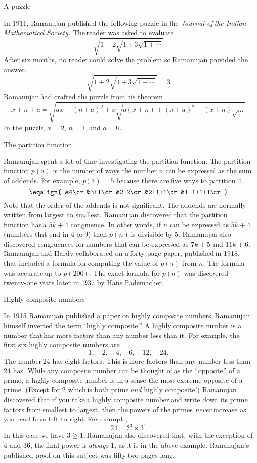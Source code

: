  A puzzle

In 1911, Ramanujan published the following puzzle in
the {\it Journal of the Indian Mathematical Society.}
The reader was asked to evaluate
$$\sqrt{1+2\sqrt{1+3\sqrt{1+\cdots}}}$$
After six months, no reader could solve the problem so Ramanujan
provided the answer.
$$\sqrt{1+2\sqrt{1+3\sqrt{1+\cdots}}}=3$$
Ramanujan had crafted the puzzle from his theorem
$$x+n+a=\sqrt{ax+(n+a)^2+x\sqrt{a(x+n)+(n+a)^2+(x+n)\sqrt{\ldots}}}$$
In the puzzle, $x=2$, $n=1$, and $a=0$.

 The partition function

Ramanujan spent a lot of time investigating the partition function.
The partition function $p(n)$ is the number of ways the number
$n$ can be expressed as the sum of addends.
For example, $p(4)=5$ because there are five ways to partition 4.
$$\eqalign{
&4\cr
&3+1\cr
&2+2\cr
&2+1+1\cr
&1+1+1+1\cr
}$$
Note that the order of the addends is not significant.
The addends are
normally written from largest to smallest.
Ramanujan discovered that the partition function has a $5k+4$
congruence.
In other words, if $n$ can be expressed as $5k+4$ (numbers that end in 4 or 9)
then $p(n)$
is divisible by 5.
Ramanujan also discovered congruences for numbers that can be expressed
as $7k+5$ and $11k+6$.
Ramanujan and Hardy collaborated on a forty-page paper, published in 1918,
that included a formula for computing the value of $p(n)$ from $n$.
The formula was accurate up to $p(200)$.
The exact formula for $p(n)$ was discovered twenty-one years later
in 1937 by Hans Rademacher.

 Highly composite numbers

In 1915 Ramanujan published a paper on highly composite numbers.
Ramanujan himself invented the term ``highly composite.''
A highly composite number is a number that has more factors than any
number less than it. For example, the first six highly composite numbers are
$$1,\quad2,\quad4,\quad6,\quad12,\quad24.$$
The number 24 has eight factors.
This is more factors than any number less than 24 has.
While any composite number can be thought of as the ``opposite'' of a prime,
a highly composite number is in a sense the most extreme opposite
of a prime.
(Except for 2 which is both prime {\it and} highly composite!)
Ramanujan discovered that if you take a highly composite number
and write down its prime factors from smallest to largest, then the
powers of the primes {\it never} increase as you read from
left to right. For example,
$$24=2^3\times3^1$$
In this case we have $3\ge1$.
Ramanujan also discovered that, with the exception of 4 and 36,
the final power is {\it always} 1, as it is in the above example.
Ramanujan's published proof on this subject was fifty-two pages long.

